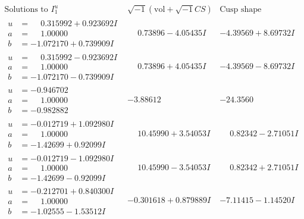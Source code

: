 \documentclass[1p]{elsarticle_modified}
\theoremstyle{definition}
\newcommand{\I}{\sqrt{-1}}
\begin{document}
$$\begin{array}{c|c|c}  
\text{Solutions to }I^u_{1}& \I (\text{vol} + \sqrt{-1}CS) & \text{Cusp shape}\\
 \hline 
\begin{aligned}
u &= \phantom{-}0.315992 + 0.923692 I \\
a &= \phantom{-}1.00000\phantom{ +0.000000I} \\
b &= -1.072170 + 0.739909 I\end{aligned}
 & \phantom{-}0.73896 - 4.05435 I & -4.39569 + 8.69732 I \\ \hline\begin{aligned}
u &= \phantom{-}0.315992 - 0.923692 I \\
a &= \phantom{-}1.00000\phantom{ +0.000000I} \\
b &= -1.072170 - 0.739909 I\end{aligned}
 & \phantom{-}0.73896 + 4.05435 I & -4.39569 - 8.69732 I \\ \hline\begin{aligned}
u &= -0.946702\phantom{ +0.000000I} \\
a &= \phantom{-}1.00000\phantom{ +0.000000I} \\
b &= -0.982882\phantom{ +0.000000I}\end{aligned}
 & -3.88612\phantom{ +0.000000I} & -24.3560\phantom{ +0.000000I} \\ \hline\begin{aligned}
u &= -0.012719 + 1.092980 I \\
a &= \phantom{-}1.00000\phantom{ +0.000000I} \\
b &= -1.42699 + 0.92099 I\end{aligned}
 & \phantom{-}10.45990 + 3.54053 I & \phantom{-}0.82342 - 2.71051 I \\ \hline\begin{aligned}
u &= -0.012719 - 1.092980 I \\
a &= \phantom{-}1.00000\phantom{ +0.000000I} \\
b &= -1.42699 - 0.92099 I\end{aligned}
 & \phantom{-}10.45990 - 3.54053 I & \phantom{-}0.82342 + 2.71051 I \\ \hline\begin{aligned}
u &= -0.212701 + 0.840300 I \\
a &= \phantom{-}1.00000\phantom{ +0.000000I} \\
b &= -1.02555 - 1.53512 I\end{aligned}
 & -0.301618 + 0.879889 I & -7.11415 - 1.14520 I \\ \hline\begin{aligned}

\end{aligned}
\end{array}$$
\end{document}
